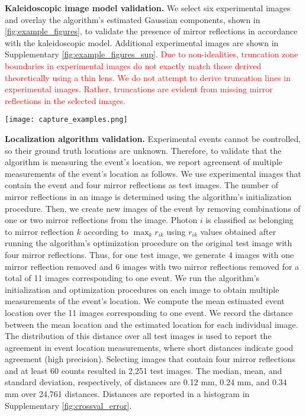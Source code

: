 \noindent
\textbf{Kaleidoscopic image model validation.}
We select six experimental images and overlay the algorithm's estimated Gaussian 
components, shown in \cref{fig:example_figures}, to validate the presence of 
mirror reflections in accordance with the kaleidoscopic model.
Additional experimental images are shown in Supplementary \cref*{fig:example_figures_sup}.
\textcolor{red}{
Due to non-idealities, truncation zone boundaries in experimental images do not 
exactly match those derived theoretically using a thin lens.
We do not attempt to derive truncation lines in experimental images.
Rather, truncations are evident from missing mirror reflections in the selected images.}

\begin{figure*}
\centering
\texttt{[image: capture\_examples.png]}
\caption{\textbf{Selected experimental images.} Experimental images overlaid with the algorithm's estimated Gaussian components.
Each dashed red circle is centered on the Gaussian component's mean. 
The inner and outer circles are one and two standard deviations in radius, respectively.
Pixels with a photon are enlarged with a $3 \times 3$ filter for visualization purposes.
} 
\label{fig:example_figures}
\end{figure*}

\noindent
\textbf{Localization algorithm validation.}
Experimental events cannot be controlled, so their ground truth locations are unknown.
Therefore, to validate that the algorithm is measuring the event's location, we 
report agreement of multiple measurements of the event's location as follows.
We use experimental images that contain the event and four mirror reflections as 
test images.
The number of mirror reflections in an image is determined using the algorithm's 
initialization procedure.
Then, we create new images of the event by removing combinations of one or two 
mirror reflections from the image.
Photon $i$ is classified as belonging to mirror reflection $k$ according to 
$\max_k r_{ik}$ using $r_{ik}$ values obtained after running the algorithm's 
optimization procedure on the original test image with four mirror reflections.
Thus, for one test image, we generate 4 images with one mirror reflection removed 
and 6 images with two mirror reflections removed for a total of 11 images 
corresponding to one event.
We run the algorithm's initialization and optimization procedures on each image to 
obtain multiple measurements of the event's location.
We compute the mean estimated event location over the 11 images corresponding to 
one event.
We record the distance between the mean location and the estimated location for 
each individual image.
The distribution of this distance over all test images is used to report the 
agreement in event location measurements, where short distances indicate good 
agreement (high precision).
Selecting images that contain four mirror reflections and at least 60 counts 
resulted in 2,251 test images.
The median, mean, and standard deviation, respectively, of 
distances are 0.12 mm, 0.24 mm, and 0.34 mm over 24,761 distances.
Distances are reported in a histogram in Supplementary \cref*{fig:crossval_error}.

